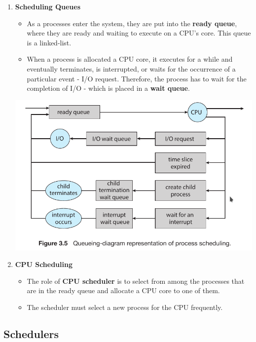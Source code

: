\documentclass[10pt]{article}
\begin{document}
\begin{enumerate}
	\item \textbf{Scheduling Queues}
	\begin{itemize}
		\item As a processes enter the system, they are put into the \textbf{ready queue}, where they are ready and waiting to execute on a CPU's core. This queue is a linked-list.
		\item When a process is allocated a CPU core, it executes for a while and eventually terminates, is interrupted, or waits for the occurrence of a particular event - I/O request. Therefore, the process has to wait for the completion of I/O - which is placed in a \textbf{wait queue}. 
	\end{itemize}

	\includegraphics[scale=0.6]{Queueing-diagram.png}
	\\
	\bigbreak

	\item \textbf{CPU Scheduling}
	\begin{itemize}
		\item The role of \textbf{CPU scheduler} is to select from among the processes that are in the ready queue and allocate a CPU core to one of them.
		\item The scheduler must select a new process for the CPU frequently.
	\end{itemize}
\end{enumerate}

\subsection{Schedulers}
\end{document}
